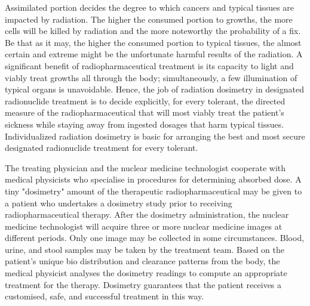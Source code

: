 \documentclass[12pt]{article}
\begin{document}
\par
Assimilated portion decides the degree to which cancers and typical tissues are impacted by radiation. The higher the consumed portion to growths, the more cells will be killed by radiation and the more noteworthy the probability of a fix. Be that as it may, the higher the consumed portion to typical tissues, the almost certain and extreme might be the unfortunate harmful results of the radiation. A significant benefit of radiopharmaceutical treatment is its capacity to light and viably treat growths all through the body; simultaneously, a few illumination of typical organs is unavoidable. Hence, the job of radiation dosimetry in designated radionuclide treatment is to decide explicitly, for every tolerant, the directed measure of the radiopharmaceutical that will most viably treat the patient's sickness while staying away from ingested dosages that harm typical tissues. Individualized radiation dosimetry is basic for arranging the best and most secure designated radionuclide treatment for every tolerant.
\par
The treating physician and the nuclear medicine technologist cooperate with medical physicists who specialise in procedures for determining absorbed dose. A tiny "dosimetry" amount of the therapeutic radiopharmaceutical may be given to a patient who undertakes a dosimetry study prior to receiving radiopharmaceutical therapy. After the dosimetry administration, the nuclear medicine technologist will acquire three or more nuclear medicine images at different periods. Only one image may be collected in some circumstances. Blood, urine, and stool samples may be taken by the treatment team. Based on the patient's unique bio distribution and clearance patterns from the body, the medical physicist analyses the dosimetry readings to compute an appropriate treatment for the therapy. Dosimetry guarantees that the patient receives a customised, safe, and successful treatment in this way.
\end{document}
